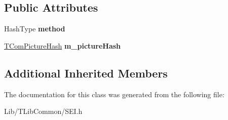 \subsection*{Public Attributes}
\begin{DoxyCompactItemize}
\item 
\mbox{\label{class_s_e_i_decoded_picture_hash_a892f3205402b2ab93991a6db41e8f939}} 
Hash\+Type {\bfseries method}
\item 
\mbox{\label{class_s_e_i_decoded_picture_hash_aca77d3fbbce02d045de8ebd32072f213}} 
\hyperlink{struct_t_com_picture_hash}{T\+Com\+Picture\+Hash} {\bfseries m\+\_\+picture\+Hash}
\end{DoxyCompactItemize}
\subsection*{Additional Inherited Members}


The documentation for this class was generated from the following file\+:\begin{DoxyCompactItemize}
\item 
Lib/\+T\+Lib\+Common/S\+E\+I.\+h\end{DoxyCompactItemize}
